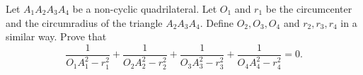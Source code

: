 Let $A_1A_2A_3A_4$ be a non-cyclic quadrilateral. Let $O_1$ and $r_1$ be the circumcenter and the circumradius of the triangle $A_2A_3A_4$. Define $O_2, O_3, O_4$ and $r_2, r_3, r_4$ in a similar way. Prove that
\[
\frac{1}{O_1A_1^2 - r_1^2} + \frac{1}{O_2A_2^2 - r_2^2} + \frac{1}{O_3A_3^2 - r_3^2} + \frac{1}{O_4A_4^2 - r_4^2} = 0.
\]
